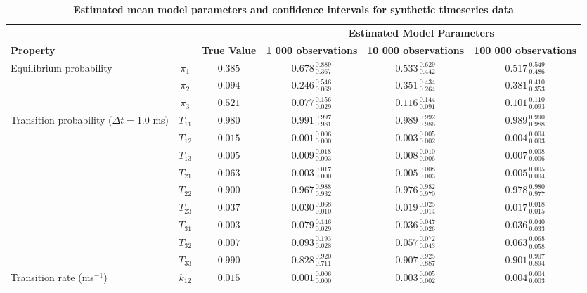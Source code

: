 
\begin{table*}
\caption{{\bf Estimated mean model parameters and confidence intervals for synthetic timeseries data}}
\label{table:synthetic-confidence-intervals}
\begin{tabular*}{\textwidth}{@{\extracolsep{\fill}}lccccc}
\hline
&  &  & \multicolumn{3}{c}{\bf Estimated Model Parameters}  \\ \cline{4-6}
\multicolumn{2}{l}{\bf Property} & \bf True Value & \bf 1 000 observations & \bf 10 000 observations & \bf 100 000 observations\\ \hline
		Equilibrium probability 		& $\pi_{1}$ & $0.385$ & $0.678_{\:0.367}^{\:0.889}$  & $0.533_{\:0.442}^{\:0.629}$  & $0.517_{\:0.486}^{\:0.549}$  \\
		& $\pi_{2}$ & $0.094$ & $0.246_{\:0.069}^{\:0.546}$  & $0.351_{\:0.264}^{\:0.434}$  & $0.381_{\:0.353}^{\:0.410}$  \\
		& $\pi_{3}$ & $0.521$ & $0.077_{\:0.029}^{\:0.156}$  & $0.116_{\:0.091}^{\:0.144}$  & $0.101_{\:0.093}^{\:0.110}$  \\
		\hline
		Transition probability ($\Delta t = $1.0 ms) 		& $T_{11}$ & $0.980$ & $0.991_{\:0.981}^{\:0.997}$ & $0.989_{\:0.986}^{\:0.992}$ & $0.989_{\:0.988}^{\:0.990}$ \\
		& $T_{12}$ & $0.015$ & $0.001_{\:0.000}^{\:0.006}$ & $0.003_{\:0.002}^{\:0.005}$ & $0.004_{\:0.003}^{\:0.004}$ \\
		& $T_{13}$ & $0.005$ & $0.009_{\:0.003}^{\:0.018}$ & $0.008_{\:0.006}^{\:0.010}$ & $0.007_{\:0.006}^{\:0.008}$ \\
		& $T_{21}$ & $0.063$ & $0.003_{\:0.000}^{\:0.017}$ & $0.005_{\:0.003}^{\:0.008}$ & $0.005_{\:0.004}^{\:0.005}$ \\
		& $T_{22}$ & $0.900$ & $0.967_{\:0.932}^{\:0.988}$ & $0.976_{\:0.970}^{\:0.982}$ & $0.978_{\:0.977}^{\:0.980}$ \\
		& $T_{23}$ & $0.037$ & $0.030_{\:0.010}^{\:0.068}$ & $0.019_{\:0.014}^{\:0.025}$ & $0.017_{\:0.015}^{\:0.018}$ \\
		& $T_{31}$ & $0.003$ & $0.079_{\:0.029}^{\:0.146}$ & $0.036_{\:0.026}^{\:0.047}$ & $0.036_{\:0.033}^{\:0.040}$ \\
		& $T_{32}$ & $0.007$ & $0.093_{\:0.028}^{\:0.193}$ & $0.057_{\:0.043}^{\:0.072}$ & $0.063_{\:0.058}^{\:0.068}$ \\
		& $T_{33}$ & $0.990$ & $0.828_{\:0.711}^{\:0.920}$ & $0.907_{\:0.887}^{\:0.925}$ & $0.901_{\:0.894}^{\:0.907}$ \\
		\hline
		\hline
		Transition rate (ms$^{-1}$) 		& $k_{12}$ & $0.015$ & $0.001_{\:0.000}^{\:0.006}$ & $0.003_{\:0.002}^{\:0.005}$ & $0.004_{\:0.003}^{\:0.004}$ \\

\end{tabular*}
\end{table*}
